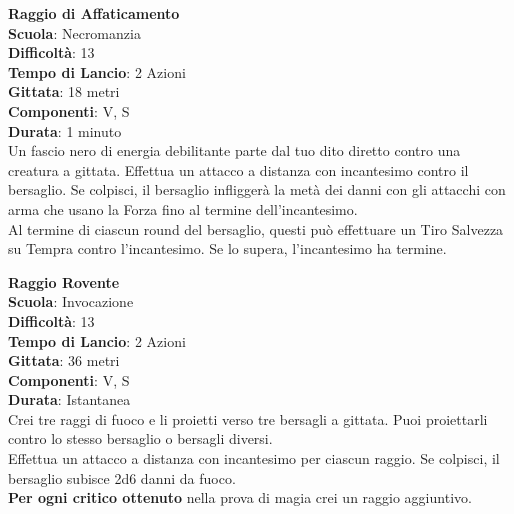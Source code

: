 \begin{multicols}{2}
\medskip\textbf{Raggio di Affaticamento}\\
\textbf{Scuola}: Necromanzia\\
\textbf{Difficoltà}:  13\\
\textbf{Tempo di Lancio}: 2 Azioni\\
\textbf{Gittata}: 18 metri\\
\textbf{Componenti}: V, S\\
\textbf{Durata}: 1 minuto\\
Un fascio nero di energia debilitante parte dal tuo dito diretto contro una creatura a gittata. Effettua un attacco a distanza con incantesimo contro il bersaglio. Se colpisci, il bersaglio infliggerà la metà dei danni con gli attacchi con arma che usano la Forza fino al termine dell'incantesimo.\\ 
Al termine di ciascun round del bersaglio, questi può effettuare un Tiro Salvezza su Tempra contro l'incantesimo. Se lo supera, l'incantesimo ha termine.

\medskip\textbf{Raggio Rovente}\\
\textbf{Scuola}: Invocazione\\
\textbf{Difficoltà}:  13\\
\textbf{Tempo di Lancio}: 2 Azioni\\
\textbf{Gittata}: 36 metri\\
\textbf{Componenti}: V, S\\
\textbf{Durata}: Istantanea\\
Crei tre raggi di fuoco e li proietti verso tre bersagli a gittata. Puoi proiettarli contro lo stesso bersaglio o bersagli diversi.\\
Effettua un attacco a distanza con incantesimo per ciascun raggio. Se colpisci, il bersaglio subisce 2d6 danni da fuoco.\\
\textbf{Per ogni critico ottenuto} nella prova di magia crei un raggio aggiuntivo.


\end{multicols}
